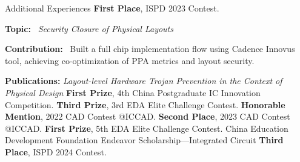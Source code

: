 
\begin{rubric}{Additional Experiences}
	\entry*[2023] \textbf{First Place}, ISPD 2023 Contest.
	\par \textbf{Topic:} ~\emph{Security Closure of Physical Layouts}
	\par \textbf{Contribution:} ~Built a full chip implementation flow using Cadence Innovus tool, achieving co-optimization of PPA metrics and layout security.
	\par \textbf{Publications:} \emph{Layout-level Hardware Trojan Prevention in the Context of Physical Design} \cite{tong2024layout}
	\entry*[2021] \textbf{First Prize}, 4th China Postgraduate IC Innovation Competition.
	\entry*[2021] \textbf{Third Prize}, 3rd EDA Elite Challenge Contest.
	\entry*[2022] \textbf{Honorable Mention}, 2022 CAD Contest @ICCAD.
	\entry*[2023] \textbf{Second Place}, 2023 CAD Contest @ICCAD.
	\entry*[2023] \textbf{First Prize}, 5th EDA Elite Challenge Contest.
	\entry*[2023] China Education Development Foundation Endeavor Scholarship—Integrated Circuit
	\entry*[2024] \textbf{Third Place}, ISPD 2024 Contest.

\end{rubric}
